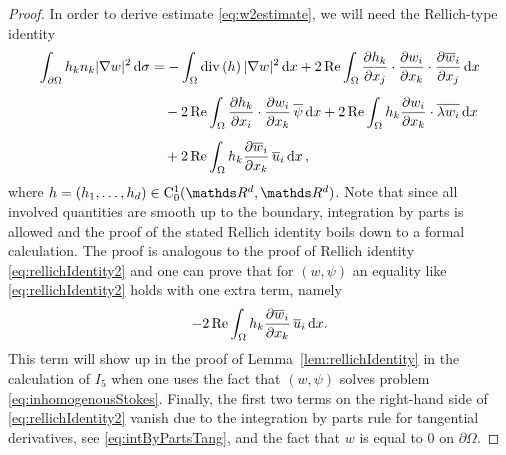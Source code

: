 \begin{proof}
  In order to derive estimate \eqref{eq:w2estimate}, we will need the Rellich-type identity
  \begin{align}
    \int_{\partial\Omega} h_k n_k |\nabla w|^2 \, {\operatorname{d}\!{\sigma}}
    &= - \int_\Omega \mathrm{div\,} (h)\, |\nabla w|^2 \, {\operatorname{d}\!{x}} 
    + 2 \operatorname{Re} \int_\Omega \frac{\partial h_k}{\partial x_j} \cdot \frac{\partial w_i}{\partial x_k} \cdot \frac{\partial \overline w_i}{\partial x_j} \, {\operatorname{d}\!{x}}  \nonumber\\[0.5em]
    &\quad - 2 \operatorname{Re} \int_\Omega \frac{\partial h_k}{\partial x_i} \cdot \frac{\partial w_i}{\partial x_k} \, \overline \psi \, {\operatorname{d}\!{x}} 
    + 2 \operatorname{Re} \int_\Omega h_k \frac{\partial w_i}{\partial x_k} \cdot \overline{ \lambda w_i} \, {\operatorname{d}\!{x}}  \nonumber\\[0.5em]
    &\quad + 2 \operatorname{Re} \int_{\Omega} h_k \frac{\partial \overline w_i}{\partial x_k} \, \overline u_i \, {\operatorname{d}\!{x}}\,, \label{eq:rellichIdentity3}
  \end{align}
  where $h = (h_1, \dots,h_d) \in \CC_0^1(\R^d, \R^d)$.
  Note that since all involved quantities are smooth up to the boundary, integration by parts is allowed and the proof of the stated  Rellich identity boils down to a formal calculation.
  The proof is analogous to the proof of Rellich identity \eqref{eq:rellichIdentity2} and one can prove that for $(w,\psi)$ an equality like \eqref{eq:rellichIdentity2} holds with one extra term, namely
  \begin{align*}
      - 2\operatorname{Re} \int_\Omega h_k \frac{\partial \overline w_i}{\partial x_k} \, \overline u_i \, {\operatorname{d}\!{x}}.
  \end{align*}
  This term will show up in the proof of Lemma~\ref{lem:rellichIdentity} in the calculation of $I_5$ when one uses the fact that $(w,\psi)$ solves problem \eqref{eq:inhomogenousStokes}.
  Finally, the first two terms on the right-hand side of \eqref{eq:rellichIdentity2} vanish due to the integration by parts rule for tangential derivatives, see \eqref{eq:intByPartsTang}, and the fact that $w$ is equal to $0$ on  $\partial\Omega$.


\end{proof}
